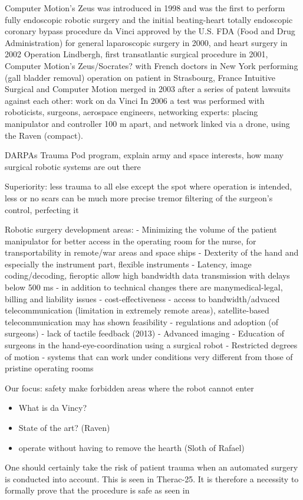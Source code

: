 Computer Motion's Zeus was introduced in 1998 and was the first to perform fully endoscopic robotic surgery and the initial beating-heart totally endoscopic coronary bypass procedure \cite{bib:brown_univ}
da Vinci approved by the U.S. FDA (Food and Drug Administration) for general laparoscopic surgery in 2000, and heart surgery in 2002 \cite{bib:brown_univ}
Operation Lindbergh, first transatlantic surgical procedure in 2001, Computer Motion's Zeus/Socrates? with French doctors in New York performing (gall bladder removal) operation on patient in Strasbourg, France
Intuitive Surgical and Computer Motion merged in 2003 after a series of patent lawsuits against each other: work on da Vinci
In 2006 a test was performed with roboticists, surgeons, aerospace engineers, networking experts: placing manipulator and controller 100 m apart, and network linked via a drone, using the Raven \cite{bib:docatadist} (compact).

DARPAs Trauma Pod program, explain army and space interests, how many surgical robotic systems are out there


Superiority:
less trauma to all else except the spot where operation is intended, less or no scars
can be much more precise
tremor filtering of the surgeon's control, perfecting it

Robotic surgery development areas:
- Minimizing the volume of the patient manipulator for better access in the operating room for the nurse, for transportability in remote/war areas and space ships
- Dexterity of the hand and especially the instrument part, flexible instruments
- Latency, image coding/decoding, fieroptic allow high bandwidth data transmission with delays below 500 ms
- in addition to technical changes there are manymedical-legal, billing and liability issues
- cost-effectiveness
- access to bandwidth/advaced telecommunication (limitation in extremely remote areas), satellite-based telecommunication may has shown feasibility
- regulations and adoption (of surgeons)
- lack of tactile feedback (2013)
- Advanced imaging
- Education of surgeons in the hand-eye-coordination using a surgical robot
- Restricted degrees of motion
- systems that can work under conditions very different from those of pristine operating rooms \cite{bib:docatadist}

Our focus:
safety
make forbidden areas where the robot cannot enter


\begin{itemize}
\item What is da Vincy?
\item State of the art? (Raven)
\item operate without having to remove the hearth (Sloth of Rafael)
\end{itemize}
One should certainly take the risk of patient trauma when an automated surgery is conducted into account. This is seen in Therac-25. It is therefore a necessity to formally prove that the procedure is safe as seen in \citep{bib:safety}
